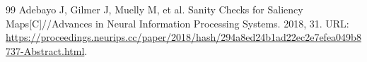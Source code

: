 {\begin{thebibliography}{99}
 Adebayo J, Gilmer J, Muelly M, et al. Sanity Checks for Saliency Maps[C]//Advances in Neural Information Processing Systems. 2018, 31. URL: \url{https://proceedings.neurips.cc/paper/2018/hash/294a8ed24b1ad22ec2e7efea049b8737-Abstract.html}.


\end{thebibliography}
}
